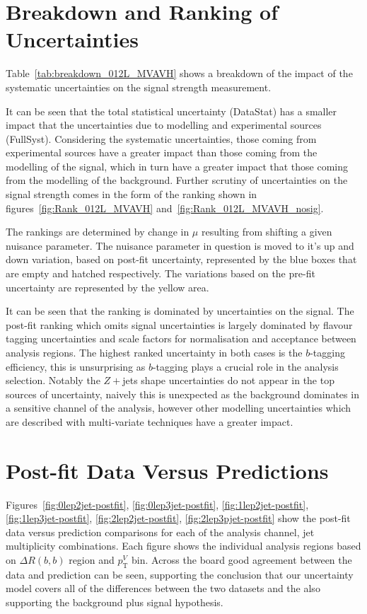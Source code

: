 \section{Breakdown and Ranking of Uncertainties}
Table~\ref{tab:breakdown_012L_MVAVH} shows a breakdown of the impact of the
systematic uncertainties on the signal strength measurement.

It can be seen that the total statistical uncertainty (DataStat) has a smaller
impact that the uncertainties due to modelling and experimental sources
(FullSyst). Considering the systematic uncertainties, those coming from
experimental sources have a greater impact than those coming from the modelling
of the signal, which in turn have a greater impact  that those coming from the
modelling of the background. Further scrutiny of uncertainties on the signal
strength comes in the form of the ranking shown in
figures~\ref{fig:Rank_012L_MVAVH} and~\ref{fig:Rank_012L_MVAVH_nosig}.

The rankings are determined by change in $\mu$ resulting from shifting a given
nuisance parameter. The nuisance parameter in question is moved to it's up and
down variation, based on post-fit uncertainty, represented by the blue boxes
that are empty and hatched respectively. The variations based on the pre-fit
uncertainty are represented by the yellow area.

It can be seen that the ranking is dominated by uncertainties on the signal. The
post-fit ranking which omits signal uncertainties is largely dominated by
flavour tagging uncertainties and scale factors for normalisation and acceptance
between analysis regions. The highest ranked uncertainty in both cases is the
$b$-tagging efficiency, this is unsurprising as $b$-tagging plays a crucial role
in the analysis selection. Notably the $Z+$jets shape uncertainties do not
appear in the top sources of uncertainty, naively this is unexpected as the
background dominates in a sensitive channel of the analysis, however other
modelling uncertainties which are described with multi-variate techniques have a
greater impact.

\section{Post-fit Data Versus Predictions}
Figures~\ref{fig:0lep2jet-postfit}, \ref{fig:0lep3jet-postfit},
\ref{fig:1lep2jet-postfit}, \ref{fig:1lep3jet-postfit},
\ref{fig:2lep2jet-postfit}, \ref{fig:2lep3pjet-postfit} show the post-fit data
versus prediction comparisons for each of the analysis channel, jet multiplicity
combinations. Each figure shows the individual analysis regions based on
$\Delta R(b, b)$ region and $p_{\mathrm{T}}^V$ bin. Across the board good
agreement between the data and prediction can be seen, supporting the conclusion
that our uncertainty model covers all of the differences between the two
datasets and the also supporting the background plus signal hypothesis.







